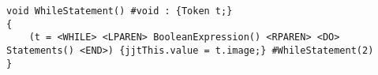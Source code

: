\begin{lstlisting}[caption=Implementation of the while statement, label=while_listing]
void WhileStatement() #void : {Token t;}
{
	(t = <WHILE> <LPAREN> BooleanExpression() <RPAREN> <DO> Statements() <END>) {jjtThis.value = t.image;} #WhileStatement(2)
}
\end{lstlisting}

